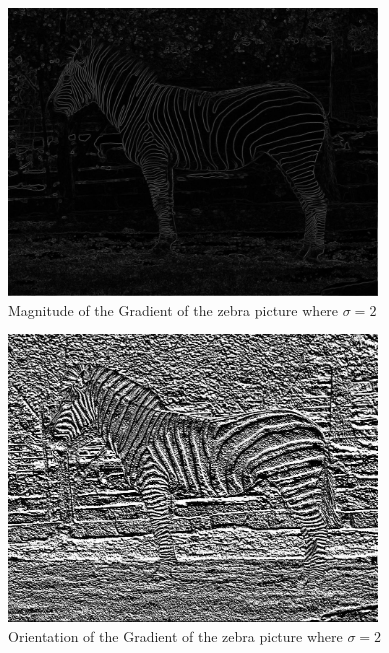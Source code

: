 \documentclass[11pt,psfig]{article}
\begin{document}
\begin{figure}[H]
\centering
\includegraphics[height=3in]{magGradient2_zebra1.jpg}
\caption{Magnitude of the Gradient of the zebra picture where $\sigma=2$}
\end{figure}

\begin{figure}[H]
\centering
\includegraphics[height=3in]{orientGradient2_zebra1.jpg}
\caption{Orientation of the Gradient of the zebra picture where $\sigma=2$}
\end{figure}
\end{document}
